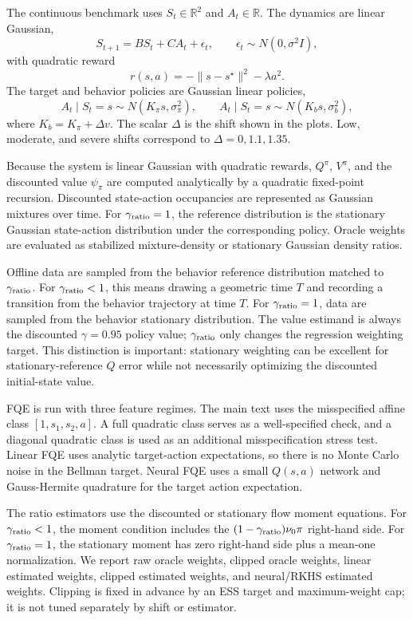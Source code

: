 The continuous benchmark uses \(S_t\in\mathbb R^2\) and \(A_t\in\mathbb R\).
The dynamics are linear Gaussian,
\[
S_{t+1}=B S_t + C A_t+\epsilon_t,
\qquad
\epsilon_t\sim N(0,\sigma^2 I),
\]
with quadratic reward
\[
r(s,a)=-\|s-s^\star\|^2-\lambda a^2 .
\]
The target and behavior policies are Gaussian linear policies,
\[
A_t\mid S_t=s \sim N(K_\pi s,\sigma_\pi^2),
\qquad
A_t\mid S_t=s \sim N(K_b s,\sigma_b^2),
\]
where \(K_b=K_\pi+\Delta v\). The scalar \(\Delta\) is the shift shown in the
plots. Low, moderate, and severe shifts correspond to \(\Delta=0,1.1,1.35\).

Because the system is linear Gaussian with quadratic rewards, \(Q^\pi\),
\(V^\pi\), and the discounted value \(\psi_\pi\) are computed analytically by a
quadratic fixed-point recursion. Discounted state-action occupancies are
represented as Gaussian mixtures over time. For \(\gamma_{\rm ratio}=1\), the
reference distribution is the stationary Gaussian state-action distribution
under the corresponding policy. Oracle weights are evaluated as stabilized
mixture-density or stationary Gaussian density ratios.

Offline data are sampled from the behavior reference distribution matched to
\(\gamma_{\rm ratio}\). For \(\gamma_{\rm ratio}<1\), this means drawing a
geometric time \(T\) and recording a transition from the behavior trajectory at
time \(T\). For \(\gamma_{\rm ratio}=1\), data are sampled from the behavior
stationary distribution. The value estimand is always the discounted
\(\gamma=0.95\) policy value; \(\gamma_{\rm ratio}\) only changes the regression
weighting target. This distinction is important: stationary weighting can be
excellent for stationary-reference \(Q\) error while not necessarily optimizing
the discounted initial-state value.

FQE is run with three feature regimes. The main text uses the misspecified
affine class \([1,s_1,s_2,a]\). A full quadratic class serves as a
well-specified check, and a diagonal quadratic class is used as an additional
misspecification stress test. Linear FQE uses analytic target-action
expectations, so there is no Monte Carlo noise in the Bellman target. Neural FQE
uses a small \(Q(s,a)\) network and Gauss-Hermite quadrature for the target
action expectation.

The ratio estimators use the discounted or stationary flow moment equations.
For \(\gamma_{\rm ratio}<1\), the moment condition includes the
\((1-\gamma_{\rm ratio})\nu_0\pi\) right-hand side. For
\(\gamma_{\rm ratio}=1\), the stationary moment has zero right-hand side plus a
mean-one normalization. We report raw oracle weights, clipped oracle weights,
linear estimated weights, clipped estimated weights, and neural/RKHS estimated
weights. Clipping is fixed in advance by an ESS target and maximum-weight cap;
it is not tuned separately by shift or estimator.


